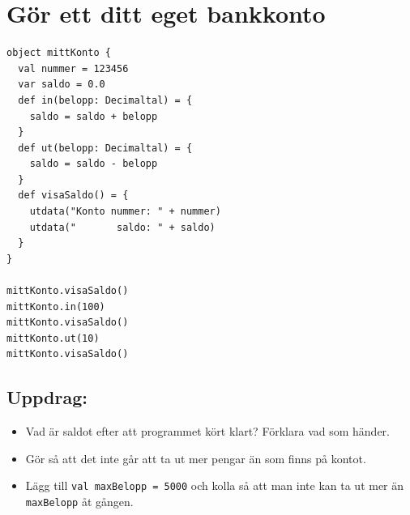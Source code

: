 \chapter{Gör ett ditt eget bankkonto}
\begin{multicols}{2}

\begin{lstlisting}[basicstyle={\ttfamily\fontsize{16}{19}\selectfont},numbers=none]
object mittKonto {
  val nummer = 123456
  var saldo = 0.0
  def in(belopp: Decimaltal) = {
    saldo = saldo + belopp 
  }
  def ut(belopp: Decimaltal) = { 
    saldo = saldo - belopp 
  }
  def visaSaldo() = {
    utdata("Konto nummer: " + nummer) 
    utdata("       saldo: " + saldo)
  }
}

mittKonto.visaSaldo()
mittKonto.in(100)
mittKonto.visaSaldo()
mittKonto.ut(10)
mittKonto.visaSaldo()
\end{lstlisting}
        


\columnbreak


\section*{\color{BrickRed}Uppdrag:}


\begin{itemize}

\item {Vad är saldot efter att programmet kört klart? Förklara vad som händer.}
\item {Gör så att det inte går att ta ut mer pengar än som finns på kontot.}
\item {Lägg till \lstinline{val maxBelopp = 5000} och kolla så att man inte kan ta ut mer än \lstinline{maxBelopp} åt gången.}

\end{itemize}


\end{multicols}

